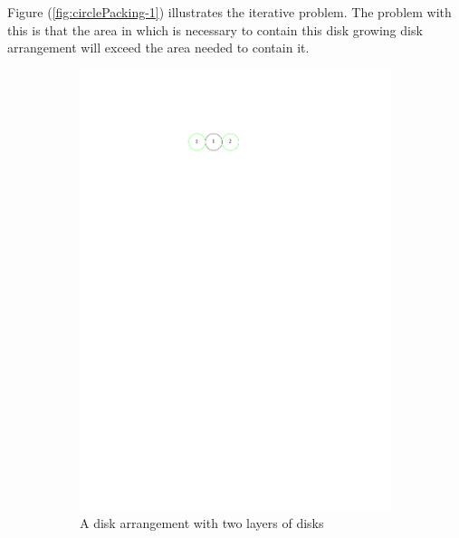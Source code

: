Figure (\ref{fig:circlePacking-1}) illustrates the iterative problem.  The problem with this is that 
the area in
which is necessary to contain this disk growing disk arrangement will exceed the area needed to 
contain it.
\begin{figure}[H]
\begin{center}
  \begin{subfigure}[b]{0.24\textwidth}
	  \includegraphics[width=\textwidth]{graphics/degree2arrangement.pdf}
	  \caption{A disk arrangement with two layers of disks}
	  \label{fig:circlePacking1-1}
  \end{subfigure}
  \begin{subfigure}[b]{0.24\textwidth}

\end{subfigure}
\end{center}
\end{figure}
